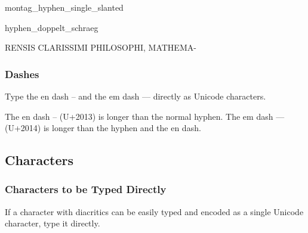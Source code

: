 \begin{sampleImage}{montag_hyphen_single_slanted} 
\end{sampleImage}

\begin{sampleImage}{hyphen_doppelt_schraeg} 
\begin{typeLatin}
RENSIS CLARISSIMI PHILOSOPHI, MATHEMA-
\end{typeLatin}
\end{sampleImage}

\subsubsection{Dashes}
\label{section dashes}

\begin{mainrule}
Type the en dash – and the em dash — directly as Unicode characters.
\end{mainrule}

\begin{clarification}
The en dash – (U+2013) is longer than the normal hyphen. The em dash — (U+2014) is longer than the hyphen and the en dash.
\end{clarification}

\tocspace
\subsection{Characters}

\subsubsection{Characters to be Typed Directly}
\label{section characters to be typed directly}

\begin{mainrule}
If a character with diacritics can be easily typed and encoded as a single Unicode character, type it directly.
\end{mainrule}

\mehrzeilen[-2]

